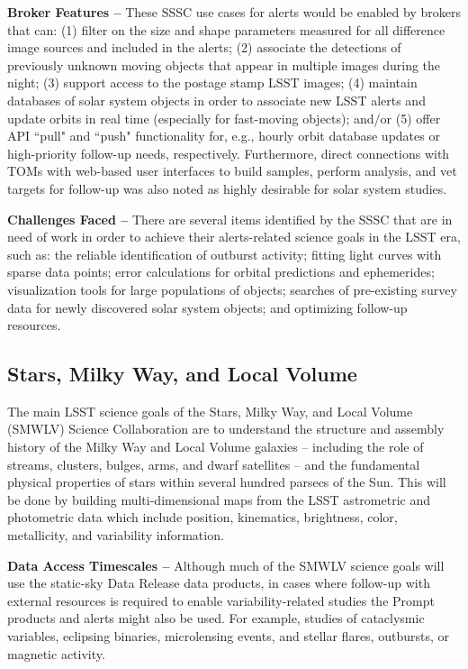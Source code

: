 {\bf Broker Features --}
These SSSC use cases for alerts would be enabled by brokers that can:
(1) filter on the size and shape parameters measured for all difference image sources and included in the alerts;
(2) associate the detections of previously unknown moving objects that appear in multiple images during the night;
(3) support access to the postage stamp LSST images;
(4) maintain databases of solar system objects in order to associate new LSST alerts and update orbits in real time (especially for fast-moving objects);
and/or (5) offer API ``pull" and ``push" functionality for, e.g., hourly orbit database updates or high-priority follow-up needs, respectively.
Furthermore, direct connections with TOMs with web-based user interfaces to build samples, perform analysis, and vet targets for follow-up was also noted as highly desirable for solar system studies. 

{\bf Challenges Faced --}
There are several items identified by the SSSC that are in need of work in order to achieve their alerts-related science goals in the LSST era, such as: 
the reliable identification of outburst activity; 
fitting light curves with sparse data points; 
error calculations for orbital predictions and ephemerides; 
visualization tools for large populations of objects; 
searches of pre-existing survey data for newly discovered solar system objects; and
optimizing follow-up resources.

\subsection{Stars, Milky Way, and Local Volume}\label{ssec:sci_smwlv}

The main LSST science goals of the Stars, Milky Way, and Local Volume (SMWLV) Science Collaboration are to understand the structure and assembly history of the Milky Way and Local Volume galaxies -- including the role of streams, clusters, bulges, arms, and dwarf satellites -- and the fundamental physical properties of stars within several hundred parsecs of the Sun.
This will be done by building multi-dimensional maps from the LSST astrometric and photometric data which include position, kinematics, brightness, color, metallicity, and variability information. 

{\bf Data Access Timescales --}
Although much of the SMWLV science goals will use the static-sky Data Release data products, in cases where follow-up with external resources is required to enable variability-related studies the Prompt products and alerts might also be used.
For example, studies of cataclysmic variables, eclipsing binaries, microlensing events, and stellar flares, outbursts, or magnetic activity.

